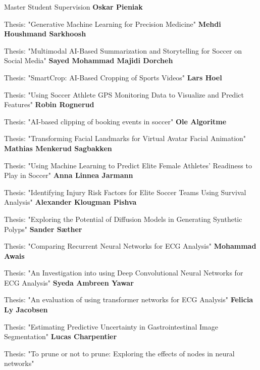 \begin{rubric}{Master Student Supervision}
    \entry*[2024]%
    \textbf{Oskar Pieniak} \par
    Thesis: "Generative Machine Learning for Precision Medicine"
    \entry*[2024]%
    \textbf{Mehdi Houshmand Sarkhoosh} \par
    Thesis: "Multimodal AI-Based Summarization and Storytelling for Soccer on Social Media"
    \entry*[2024]%
    \textbf{Sayed Mohammad Majidi Dorcheh} \par
    Thesis: "SmartCrop: AI-Based Cropping of Sports Videos"
    \entry*[2023]%
    \textbf{Lars Hoel} \par
    Thesis: "Using Soccer Athlete GPS Monitoring Data to Visualize and Predict Features"
    \entry*[2023]%
    \textbf{Robin Rognerud} \par
    Thesis: "AI-based clipping of booking events in soccer"
    \entry*[2023]%
    \textbf{Ole Algoritme} \par
    Thesis: "Transforming Facial Landmarks for Virtual Avatar Facial Animation"
    \entry*[2023]%
    \textbf{Mathias Menkerud Sagbakken} \par
    Thesis: "Using Machine Learning to Predict Elite Female Athletes' Readiness to Play in Soccer"
    \entry*[2023]%
    \textbf{Anna Linnea Jarmann} \par
    Thesis: "Identifying Injury Risk Factors for Elite Soccer Teams Using Survival Analysis"
    \entry*[2023]%
    \textbf{Alexander Klougman Pishva} \par
    Thesis: "Exploring the Potential of Diffusion Models in Generating Synthetic Polyps"
    \entry*[2023]%
    \textbf{Sander Sæther} \par
    Thesis: "Comparing Recurrent Neural Networks for ECG Analysis"
    \entry*[2023]%
    \textbf{Mohammad Awais} \par
    Thesis: "An Investigation into using Deep Convolutional Neural Networks for ECG Analysis"
    \entry*[2023]%
    \textbf{Syeda Ambreen Yawar} \par
    Thesis: "An evaluation of using transformer networks for ECG Analysis"
    \entry*[2022]%
    \textbf{Felicia Ly Jacobsen} \par
    Thesis: "Estimating Predictive Uncertainty in Gastrointestinal Image Segmentation"
    \entry*[2021]%
    \textbf{Lucas Charpentier} \par
    Thesis: "To prune or not to prune: Exploring the effects of nodes in neural networks"

\end{rubric}
